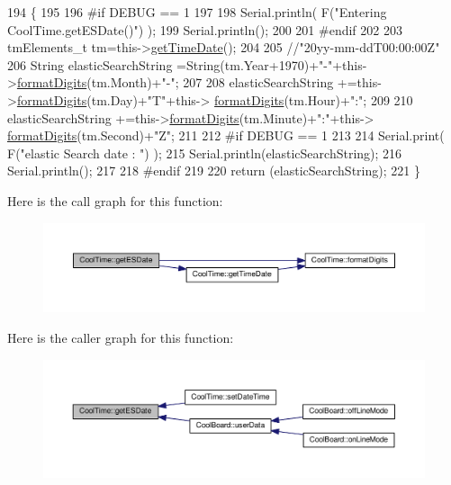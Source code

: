 \begin{DoxyCode}
194 \{
195 
196 \textcolor{preprocessor}{#if DEBUG == 1 }
197 
198     Serial.println( F(\textcolor{stringliteral}{"Entering CoolTime.getESDate()"}) );
199     Serial.println();
200 
201 \textcolor{preprocessor}{#endif }
202 
203     tmElements\_t tm=this->\hyperlink{classCoolTime_a7a7501c5ca77dd1248bea704c44f986c}{getTimeDate}();
204 
205     \textcolor{comment}{//"20yy-mm-ddT00:00:00Z"}
206     String elasticSearchString =String(tm.Year+1970)+\textcolor{stringliteral}{"-"}+this->\hyperlink{classCoolTime_acd537cd4210d7bde4e1f5c47d2ac0456}{formatDigits}(tm.Month)+\textcolor{stringliteral}{"-"};
207 
208     elasticSearchString +=this->\hyperlink{classCoolTime_acd537cd4210d7bde4e1f5c47d2ac0456}{formatDigits}(tm.Day)+\textcolor{stringliteral}{"T"}+this->
      \hyperlink{classCoolTime_acd537cd4210d7bde4e1f5c47d2ac0456}{formatDigits}(tm.Hour)+\textcolor{stringliteral}{":"};
209     
210     elasticSearchString +=this->\hyperlink{classCoolTime_acd537cd4210d7bde4e1f5c47d2ac0456}{formatDigits}(tm.Minute)+\textcolor{stringliteral}{":"}+this->
      \hyperlink{classCoolTime_acd537cd4210d7bde4e1f5c47d2ac0456}{formatDigits}(tm.Second)+\textcolor{stringliteral}{"Z"};
211 
212 \textcolor{preprocessor}{#if DEBUG == 1 }
213 
214     Serial.print( F(\textcolor{stringliteral}{"elastic Search date : "}) );
215     Serial.println(elasticSearchString);
216     Serial.println();
217 
218 \textcolor{preprocessor}{#endif}
219 
220     \textcolor{keywordflow}{return} (elasticSearchString);
221 \}
\end{DoxyCode}
Here is the call graph for this function\+:\nopagebreak
\begin{figure}[H]
\begin{center}
\leavevmode
\includegraphics[width=350pt]{classCoolTime_ac4f32ee513c1328d984306645e8785a4_cgraph}
\end{center}
\end{figure}
Here is the caller graph for this function\+:\nopagebreak
\begin{figure}[H]
\begin{center}
\leavevmode
\includegraphics[width=350pt]{classCoolTime_ac4f32ee513c1328d984306645e8785a4_icgraph}
\end{center}
\end{figure}
\mbox{\label{classCoolTime_a5d17f707a9d337720493b2bce9d41c21}} 
